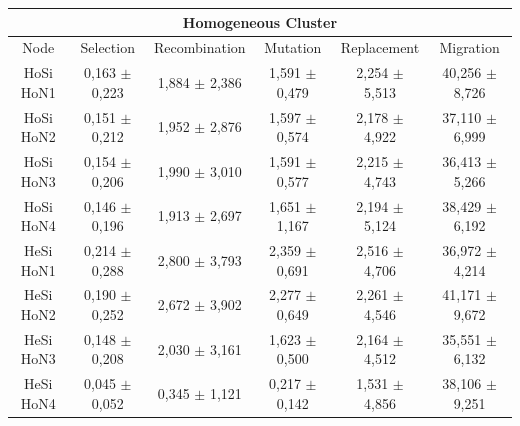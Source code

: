 \documentclass[final,1p,times]{elsarticle}
\begin{document}
\begin{table}[htb]
{\begin{tabular}{|c|c|c|c|c|c|}
\multicolumn{6}{|c|}{Homogeneous Cluster} \\ \hline									
Node	& Selection		& Recombination		& Mutation		& Replacement		& Migration	\\ \hline
HoSi HoN1    & 0,163 $\pm$  0,223 &  1,884 $\pm$  2,386  & 1,591  $\pm$ 0,479 &  2,254  $\pm$ 5,513  & 40,256  $\pm$ 8,726\\ \hline
HoSi HoN2    & 0,151 $\pm$  0,212 &  1,952 $\pm$  2,876  & 1,597  $\pm$ 0,574 &  2,178  $\pm$ 4,922  & 37,110  $\pm$ 6,999\\ \hline
HoSi HoN3    & 0,154 $\pm$  0,206 &  1,990 $\pm$  3,010  & 1,591  $\pm$ 0,577 &  2,215  $\pm$ 4,743  & 36,413  $\pm$ 5,266\\ \hline
HoSi HoN4    & 0,146 $\pm$  0,196 &  1,913 $\pm$  2,697  & 1,651  $\pm$ 1,167 &  2,194  $\pm$ 5,124  & 38,429  $\pm$ 6,192\\ \hline \hline
HeSi HoN1    & 0,214 $\pm$  0,288  & 2,800  $\pm$ 3,793 &  2,359 $\pm$  0,691 &  2,516  $\pm$ 4,706 &  36,972 $\pm$ 4,214 \\ \hline
HeSi HoN2    & 0,190 $\pm$  0,252  & 2,672  $\pm$ 3,902 &  2,277 $\pm$  0,649 &  2,261  $\pm$ 4,546 &  41,171 $\pm$ 9,672 \\ \hline
HeSi HoN3    & 0,148 $\pm$  0,208  & 2,030  $\pm$ 3,161 &  1,623 $\pm$  0,500 &  2,164  $\pm$ 4,512 &  35,551 $\pm$  6,132 \\ \hline
HeSi HoN4    & 0,045 $\pm$  0,052  & 0,345  $\pm$ 1,121 &  0,217 $\pm$  0,142 &  1,531  $\pm$ 4,856 &  38,106 $\pm$ 9,251 \\ \hline
\end{tabular}
}
\label{tab:mmdptimes}
\end{table}
\end{document}
